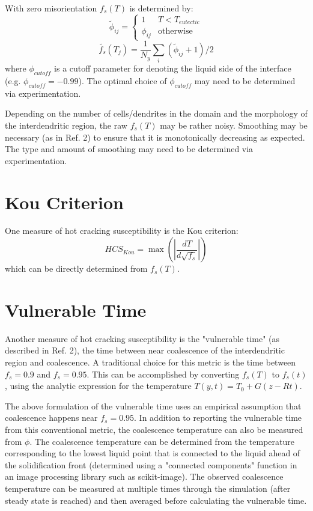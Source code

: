 \documentclass[11pt]{article}
\begin{document}
With zero misorientation $f_s(T)$ is determined by:
\begin{equation}
 \tilde{\phi}_{ij} =
    \begin{cases}
      1 & T < T_{eutectic}\\
      \phi_{ij} & \text{otherwise}
    \end{cases}       
\end{equation}
\begin{equation}
\tilde{f_s}(T_j) = \frac{1}{N_y} \sum_i (\tilde{\phi}_{ij}+1)/2
\end{equation}
where $\phi_{cutoff}$ is a cutoff parameter for denoting the liquid side of the interface (e.g. $\phi_{cutoff} = -0.99$). The optimal choice of $\phi_{cutoff}$ may need to be determined via experimentation.

Depending on the number of cells/dendrites in the domain and the morphology of the interdendritic region, the raw $f_s(T)$ may be rather noisy. Smoothing may be necessary (as in Ref. 2) to ensure that it is monotonically decreasing as expected. The type and amount of smoothing may need to be determined via experimentation.

\section{Kou Criterion}
One measure of hot cracking susceptibility is the Kou criterion:
\begin{equation}
HCS_{Kou} = \max \left(\left|\frac{dT}{d\sqrt{f_s}} \right| \right)
\end{equation}
which can be directly determined from $f_s(T)$.

\section{Vulnerable Time}
Another measure of hot cracking susceptibility is the "vulnerable time" (as described in Ref. 2), the time between near coalescence of the interdendritic region and coalescence. A traditional choice for this metric is the time between $f_s=0.9$ and $f_s=0.95$. This can be accomplished by converting $f_s(T)$ to $f_s(t)$, using the analytic expression for the temperature $T(y,t)=T_0+G(z-Rt)$.

The above formulation of the vulnerable time uses an empirical assumption that coalescence happens near $f_s=0.95$. In addition to reporting the vulnerable time from this conventional metric, the coalescence temperature can also be measured from $\phi$. The coalescence temperature can be determined from the temperature corresponding to the lowest liquid point that is connected to the liquid ahead of the solidification front (determined using a "connected components" function in an image processing library such as scikit-image). The observed coalescence temperature can be measured at multiple times through the simulation (after steady state is reached) and then averaged before calculating the vulnerable time.
\end{document}
